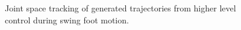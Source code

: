 \begin{figure}[!h]
	\begin{center}
	\end{center}
  	\caption{Joint space tracking of generated trajectories from higher level control during swing foot motion.}
	\label{fig:swingfootq}
\end{figure} 
\cleardoublepage





